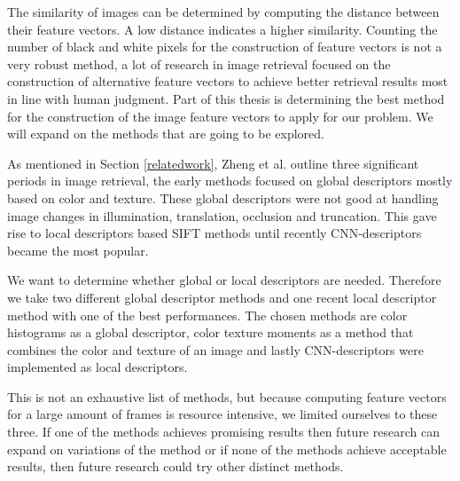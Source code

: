 \documentclass{article}
\begin{document}
The similarity of images can be determined by computing the distance between their feature vectors. A low distance indicates a higher similarity. Counting the number of black and white pixels for the construction of feature vectors is not a very robust method, a lot of research in image retrieval focused on the construction of alternative feature vectors to achieve better retrieval results most in line with human judgment. Part of this thesis is determining the best method for the construction of the image feature vectors to apply for our problem. We will expand on the methods that are going to be explored. 

As mentioned in Section \ref{relatedwork}, Zheng et al. \cite{zheng2018sift} outline three significant periods in image retrieval, the early methods focused on global descriptors mostly based on color and texture. These global descriptors were not good at handling image changes in illumination, translation, occlusion and truncation. This gave rise to local descriptors based SIFT methods until recently CNN-descriptors became the most popular. 

We want to determine whether global or local descriptors are needed. Therefore we take two different global descriptor methods and one recent local descriptor method with one of the best performances. The chosen methods are color histograms as a global descriptor, color texture moments \cite{yu2002colortexturemoments} as a method that combines the color and texture of an image and lastly CNN-descriptors were implemented as local descriptors.

This is not an exhaustive list of methods, but because computing feature vectors for a large amount of frames is resource intensive, we limited ourselves to these three. If one of the methods achieves promising results then future research can expand on variations of the method or if none of the methods achieve acceptable results, then future research could try other distinct methods.
\end{document}
